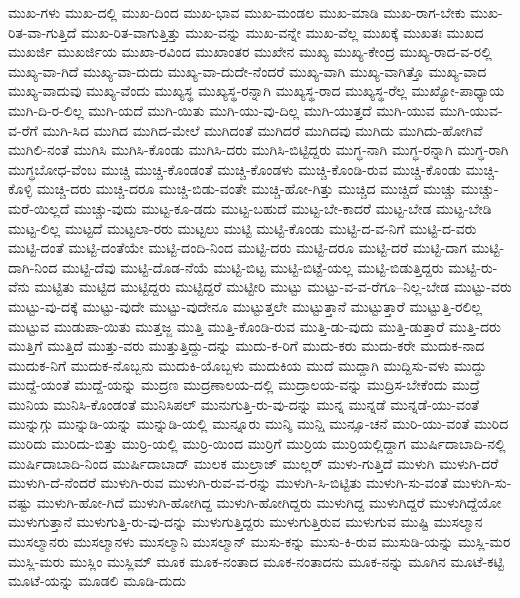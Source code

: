 {ಮುಖ-ಗಳು
ಮುಖ-ದಲ್ಲಿ
ಮುಖ-ದಿಂದ
ಮುಖ-ಭಾವ
ಮುಖ-ಮಂಡಲ
ಮುಖ-ಮಾಡಿ
ಮುಖ-ರಾಗ-ಬೇಕು
ಮುಖ-ರಿತ-ವಾ-ಗುತ್ತಿದೆ
ಮುಖ-ರಿತ-ವಾಗುತ್ತಿತ್ತು
ಮುಖ-ವನ್ನು
ಮುಖ-ವನ್ನೇ
ಮುಖ-ವೆಲ್ಲ
ಮುಖಕ್ಕೆ
ಮುಖತಃ
ಮುಖದ
ಮುಖರ್ಜಿ
ಮುಖರ್ಜಿಯ
ಮುಖಾ-ರವಿಂದ
ಮುಖಾಂತರ
ಮುಖೇನ
ಮುಖ್ಯ
ಮುಖ್ಯ-ಕೇಂದ್ರ
ಮುಖ್ಯ-ರಾದ-ವ-ರಲ್ಲಿ
ಮುಖ್ಯ-ವಾ-ಗಿದೆ
ಮುಖ್ಯ-ವಾ-ದುದು
ಮುಖ್ಯ-ವಾ-ದುದೇ-ನೆಂದರೆ
ಮುಖ್ಯ-ವಾಗಿ
ಮುಖ್ಯ-ವಾಗಿತ್ತೊ
ಮುಖ್ಯ-ವಾದ
ಮುಖ್ಯ-ವಾದುವು
ಮುಖ್ಯ-ವೆಂದು
ಮುಖ್ಯಸ್ಥ
ಮುಖ್ಯಸ್ಥ-ರನ್ನಾಗಿ
ಮುಖ್ಯಸ್ಥ-ರಾದ
ಮುಖ್ಯಸ್ಥ-ರೆಲ್ಲ
ಮುಖ್ಯೋ-ಪಾಧ್ಯಾಯ
ಮುಗಿ-ದಿ-ರ-ಲಿಲ್ಲ
ಮುಗಿ-ಯದೆ
ಮುಗಿ-ಯಿತು
ಮುಗಿ-ಯು-ವು-ದಿಲ್ಲ
ಮುಗಿ-ಯುತ್ತದೆ
ಮುಗಿ-ಯುವ
ಮುಗಿ-ಯುವ-ವ-ರೆಗೆ
ಮುಗಿ-ಸಿದ
ಮುಗಿದ
ಮುಗಿದ-ಮೇಲೆ
ಮುಗಿದಂತೆ
ಮುಗಿದರೆ
ಮುಗಿದವು
ಮುಗಿದು
ಮುಗಿದು-ಹೋಗಿವೆ
ಮುಗಿಲಿ-ನಂತೆ
ಮುಗಿಸಿ
ಮುಗಿಸಿ-ಕೊಂಡು
ಮುಗಿಸಿ-ದರು
ಮುಗಿಸಿ-ಬಿಟ್ಟಿದ್ದರು
ಮುಗ್ಧ-ನಾಗಿ
ಮುಗ್ಧ-ರನ್ನಾಗಿ
ಮುಗ್ಧ-ರಾಗಿ
ಮುಗ್ಧಬೋಧ-ವೆಂಬ
ಮುಚ್ಚಿ
ಮುಚ್ಚಿ-ಕೊಂಡಂತೆ
ಮುಚ್ಚಿ-ಕೊಂಡಳು
ಮುಚ್ಚಿ-ಕೊಂಡಿ-ರುವ
ಮುಚ್ಚಿ-ಕೊಂಡು
ಮುಚ್ಚಿ-ಕೊಳ್ಳಿ
ಮುಚ್ಚಿ-ದರು
ಮುಚ್ಚಿ-ದರೂ
ಮುಚ್ಚಿ-ಬಿಡು-ವಂತೇ
ಮುಚ್ಚಿ-ಹೋ-ಗಿತ್ತು
ಮುಚ್ಚಿದ
ಮುಚ್ಚಿದೆ
ಮುಚ್ಚು
ಮುಚ್ಚು-ಮರೆ-ಯಿಲ್ಲದೆ
ಮುಚ್ಚು-ವುದು
ಮುಟ್ಟ-ಕೂ-ಡದು
ಮುಟ್ಟ-ಬಹುದೆ
ಮುಟ್ಟ-ಬೇ-ಕಾದರೆ
ಮುಟ್ಟ-ಬೇಡ
ಮುಟ್ಟ-ಬೇಡಿ
ಮುಟ್ಟ-ಲಿಲ್ಲ
ಮುಟ್ಟದೆ
ಮುಟ್ಟಲಾ-ರರು
ಮುಟ್ಟಲು
ಮುಟ್ಟಿ
ಮುಟ್ಟಿ-ಕೊಂಡು
ಮುಟ್ಟಿ-ದ-ವ-ನಿಗೆ
ಮುಟ್ಟಿ-ದ-ವರು
ಮುಟ್ಟಿ-ದಂತೆ
ಮುಟ್ಟಿ-ದಂತೆಯೇ
ಮುಟ್ಟಿ-ದಂದಿ-ನಿಂದ
ಮುಟ್ಟಿ-ದರು
ಮುಟ್ಟಿ-ದರೂ
ಮುಟ್ಟಿ-ದರೆ
ಮುಟ್ಟಿ-ದಾಗ
ಮುಟ್ಟಿ-ದಾಗಿ-ನಿಂದ
ಮುಟ್ಟಿ-ದೆವು
ಮುಟ್ಟಿ-ದೊಡ-ನೆಯೆ
ಮುಟ್ಟಿ-ಬಿಟ್ಟ
ಮುಟ್ಟಿ-ಬಿಟ್ಟೆ-ಯಲ್ಲ
ಮುಟ್ಟಿ-ಬಿಡುತ್ತಿದ್ದರು
ಮುಟ್ಟಿ-ರು-ವೆನು
ಮುಟ್ಟಿತು
ಮುಟ್ಟಿದ
ಮುಟ್ಟಿದ್ದರು
ಮುಟ್ಟಿದ್ದರೆ
ಮುಟ್ಟೀರಿ
ಮುಟ್ಟು
ಮುಟ್ಟು-ವ-ವ-ರೆಗೂ--ನಿಲ್ಲ-ಬೇಡ
ಮುಟ್ಟು-ವರು
ಮುಟ್ಟು-ವು-ದಕ್ಕೆ
ಮುಟ್ಟು-ವುದೇ
ಮುಟ್ಟು-ವುದೇನೂ
ಮುಟ್ಟುತ್ತಲೇ
ಮುಟ್ಟುತ್ತಾನೆ
ಮುಟ್ಟುತ್ತಾರೆ
ಮುಟ್ಟುತ್ತಿ-ರಲಿಲ್ಲ
ಮುಟ್ಟುವ
ಮುಡುಪಾ-ಯಿತು
ಮುತ್ತಜ್ಜ
ಮುತ್ತಿ
ಮುತ್ತಿ-ಕೊಂಡಿ-ರುವ
ಮುತ್ತಿ-ಡು-ವುದು
ಮುತ್ತಿ-ಡುತ್ತಾರೆ
ಮುತ್ತಿ-ದರು
ಮುತ್ತಿಗೆ
ಮುತ್ತಿದೆ
ಮುತ್ತು-ವರು
ಮುತ್ತುತ್ತಿದ್ದು-ದನ್ನು
ಮುದು-ಕ-ರಿಗೆ
ಮುದು-ಕರು
ಮುದು-ಕರೇ
ಮುದುಕ-ನಾದ
ಮುದುಕ-ನಿಗೆ
ಮುದುಕ-ನೊಬ್ಬನು
ಮುದುಕಿ-ಯೊಬ್ಬಳು
ಮುದುಕಿಯ
ಮುದೆ
ಮುದ್ದಾಗಿ
ಮುದ್ದಿಸು-ವಳು
ಮುದ್ದು
ಮುದ್ದೆ-ಯಂತೆ
ಮುದ್ದೆ-ಯನ್ನು
ಮುದ್ರಣ
ಮುದ್ರಣಾಲಯ-ದಲ್ಲಿ
ಮುದ್ರಾಲಯ-ವನ್ನು
ಮುದ್ರಿಸ-ಬೇಕೆಂದು
ಮುದ್ರೆ
ಮುನಿಯ
ಮುನಿಸಿ-ಕೊಂಡಂತೆ
ಮುನಿಸಿಪಲ್
ಮುನುಗುತ್ತಿ-ರು-ವು-ದನ್ನು
ಮುನ್ನ
ಮುನ್ನಡೆ
ಮುನ್ನಡೆ-ಯು-ವಂತೆ
ಮುನ್ನುಗ್ಗು
ಮುನ್ನುಡಿ-ಯನ್ನು
ಮುನ್ನುಡಿ-ಯಲ್ಲಿ
ಮುನ್ನೂರು
ಮುನ್ಶಿ
ಮುನ್ಷಿ
ಮುನ್ಸೂ-ಚನೆ
ಮುರಿ-ಯು-ವಂತೆ
ಮುರಿದ
ಮುರಿದು
ಮುರಿದು-ಬಿತ್ತು
ಮುರ್ರಿ-ಯಲ್ಲಿ
ಮುರ್ರಿ-ಯಿಂದ
ಮುರ್ರಿಗೆ
ಮುರ್ರಿಯ
ಮುರ್ರಿಯಲ್ಲಿದ್ದಾಗ
ಮುರ್ಷಿದಾಬಾದಿ-ನಲ್ಲಿ
ಮುರ್ಷಿದಾಬಾದಿ-ನಿಂದ
ಮುರ್ಷಿದಾಬಾದ್
ಮುಲಕ
ಮುಲ್ರಾಜ್
ಮುಲ್ಲರ್
ಮುಳು-ಗುತ್ತಿದೆ
ಮುಳುಗಿ
ಮುಳುಗಿ-ದರೆ
ಮುಳುಗಿ-ದೆ-ನೆಂದರೆ
ಮುಳುಗಿ-ರುವ
ಮುಳುಗಿ-ರುವ-ವ-ರನ್ನು
ಮುಳುಗಿ-ಸಿ-ಬಿಟ್ಟಿತು
ಮುಳುಗಿ-ಸು-ವಂತೆ
ಮುಳುಗಿ-ಸು-ವಷ್ಟು
ಮುಳುಗಿ-ಹೋ-ಗಿದೆ
ಮುಳುಗಿ-ಹೋಗಿದ್ದ
ಮುಳುಗಿ-ಹೋಗಿದ್ದರು
ಮುಳುಗಿದ್ದ
ಮುಳುಗಿದ್ದರೆ
ಮುಳುಗಿದ್ದೆಯೋ
ಮುಳುಗುತ್ತಾನೆ
ಮುಳುಗುತ್ತಿ-ರು-ವು-ದನ್ನು
ಮುಳುಗುತ್ತಿದ್ದರು
ಮುಳುಗುತ್ತಿರುವ
ಮುಳುಗುವ
ಮುಷ್ಟಿ
ಮುಸಲ್ಮಾನ
ಮುಸಲ್ಮಾನರು
ಮುಸಲ್ಮಾನಳು
ಮುಸಲ್ಮಾನಿ
ಮುಸಲ್ಮಾನ್
ಮುಸು-ಕನ್ನು
ಮುಸು-ಕಿ-ರುವ
ಮುಸುಡಿ-ಯನ್ನು
ಮುಸ್ಲಿ-ಮರ
ಮುಸ್ಲಿ-ಮರು
ಮುಸ್ಲಿಂ
ಮುಸ್ಲಿಮ್
ಮೂಕ
ಮೂಕ-ನಂತಾದ
ಮೂಕ-ನಂತಾದನು
ಮೂಕ-ನನ್ನು
ಮೂಗಿನ
ಮೂಟೆ-ಕಟ್ಟಿ
ಮೂಟೆ-ಯನ್ನು
ಮೂಡಲಿ
ಮೂಡಿ-ದುದು
}
